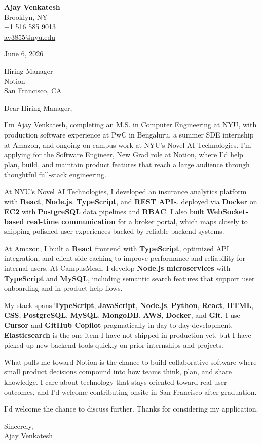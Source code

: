\documentclass[letterpaper,11pt]{article}
\begin{document}
\begin{flushleft}
\textbf{\large Ajay Venkatesh} \\
Brooklyn, NY \\
+1 516 585 9013 \\
\href{mailto:av3855@nyu.edu}{av3855@nyu.edu}
\end{flushleft}
\vspace{10pt}
June 6, 2026
\vspace{6pt}

Hiring Manager \\
Notion \\
San Francisco, CA

\vspace{10pt}

Dear Hiring Manager,

I'm Ajay Venkatesh, completing an M.S. in Computer Engineering at NYU, with production software experience at PwC in Bengaluru, a summer SDE internship at Amazon, and ongoing on-campus work at NYU's Novel AI Technologies. I'm applying for the Software Engineer, New Grad role at Notion, where I'd help plan, build, and maintain product features that reach a large audience through thoughtful full-stack engineering.

At NYU's Novel AI Technologies, I developed an insurance analytics platform with \textbf{React}, \textbf{Node.js}, \textbf{TypeScript}, and \textbf{REST APIs}, deployed via \textbf{Docker} on \textbf{EC2} with \textbf{PostgreSQL} data pipelines and \textbf{RBAC}. I also built \textbf{WebSocket-based real-time communication} for a broker portal, which maps closely to shipping polished user experiences backed by reliable backend systems.

At Amazon, I built a \textbf{React} frontend with \textbf{TypeScript}, optimized API integration, and client-side caching to improve performance and reliability for internal users. At CampusMesh, I develop \textbf{Node.js microservices} with \textbf{TypeScript} and \textbf{MySQL}, including semantic search features that support user onboarding and in-product help flows.

My stack spans \textbf{TypeScript}, \textbf{JavaScript}, \textbf{Node.js}, \textbf{Python}, \textbf{React}, \textbf{HTML}, \textbf{CSS}, \textbf{PostgreSQL}, \textbf{MySQL}, \textbf{MongoDB}, \textbf{AWS}, \textbf{Docker}, and \textbf{Git}. I use \textbf{Cursor} and \textbf{GitHub Copilot} pragmatically in day-to-day development. \textbf{Elasticsearch} is the one item I have not shipped in production yet, but I have picked up new backend tools quickly on prior internships and projects.

What pulls me toward Notion is the chance to build collaborative software where small product decisions compound into how teams think, plan, and share knowledge. I care about technology that stays oriented toward real user outcomes, and I'd welcome contributing onsite in San Francisco after graduation.

I'd welcome the chance to discuss further. Thanks for considering my application.

\vspace{12pt}
Sincerely, \\
Ajay Venkatesh
\end{document}
